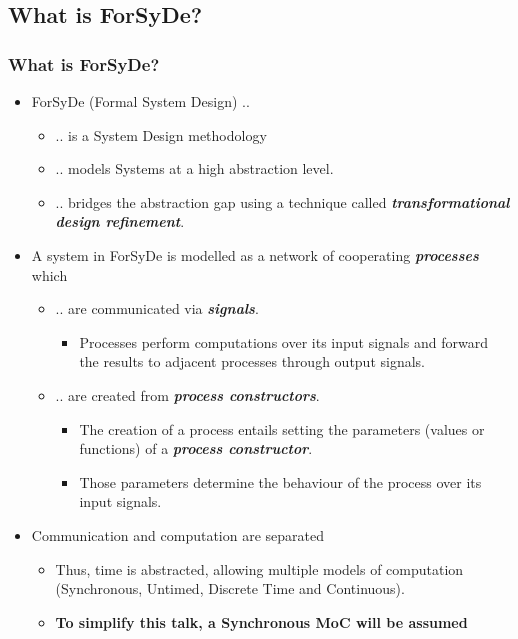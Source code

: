 \documentclass{beamer}
\begin{document}
\subsection{What is ForSyDe?}
\begin{frame}
  \frametitle{What is ForSyDe?}
  \begin{itemize}
  \item ForSyDe (Formal System Design) ..
    \begin{itemize}
      \item .. is a System Design methodology
      \item .. models Systems at a high abstraction level.
      \item .. bridges the abstraction gap using a technique called 
            \textit{\textbf{transformational design refinement}}.
    \end{itemize}
  \item A system in ForSyDe is modelled as a network of cooperating
    \textit{\textbf{processes}} which  
     \begin{itemize}
      \item .. are communicated via \textit{\textbf{signals}}.
         \begin{itemize}
         \item Processes perform computations over its input signals
           and forward the results to adjacent processes through
           output signals.
         \end{itemize}
      \item .. are created from \textit{\textbf{process constructors}}.
      \begin{itemize}
      \item The creation of a process entails setting the parameters (values
        or functions) of a \textit{\textbf{process constructor}}.
      \item Those parameters determine the behaviour of the process over its
        input signals.
      \end{itemize}
    \end{itemize}
  \item Communication and computation are separated
    \begin{itemize}  
    \item Thus, time is abstracted, allowing multiple models of computation
      (Synchronous, Untimed, Discrete Time and Continuous).
    \item \textbf{To simplify this talk, a Synchronous MoC will be assumed}
    \end{itemize}
  \end{itemize}
\end{frame}
\end{document}
